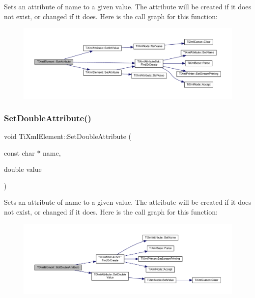 Sets an attribute of name to a given value. The attribute will be created if it does not exist, or changed if it does. Here is the call graph for this function\+:\nopagebreak
\begin{figure}[H]
\begin{center}
\leavevmode
\includegraphics[width=350pt]{class_ti_xml_element_ace6f4be75e373726d4774073d666d1a7_cgraph}
\end{center}
\end{figure}
\mbox{\label{class_ti_xml_element_a0d1dd975d75496778177e35abfe0ec0b}} 
\subsubsection{\texorpdfstring{Set\+Double\+Attribute()}{SetDoubleAttribute()}}
{\footnotesize\ttfamily void Ti\+Xml\+Element\+::\+Set\+Double\+Attribute (\begin{DoxyParamCaption}\item[{const char $\ast$}]{name,  }\item[{double}]{value }\end{DoxyParamCaption})}

Sets an attribute of name to a given value. The attribute will be created if it does not exist, or changed if it does. Here is the call graph for this function\+:\nopagebreak
\begin{figure}[H]
\begin{center}
\leavevmode
\includegraphics[width=350pt]{class_ti_xml_element_a0d1dd975d75496778177e35abfe0ec0b_cgraph}
\end{center}
\end{figure}
\mbox{\label{class_ti_xml_element_a940fc8aa953e0ef0de6e110b7d98b8ee}} 
